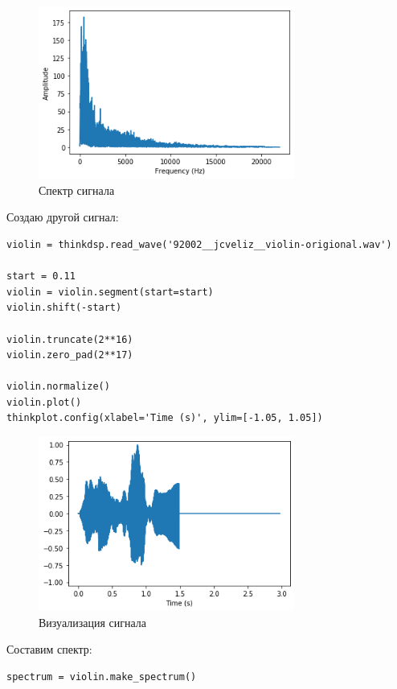 \documentclass[a4paper,12pt]{report}
\begin{document}
\begin{figure}[H]
        \centering
        \includegraphics[width=0.75\textwidth]{2.png}
        \caption{Спектр сигнала}
        \label{2}
\end{figure}

Создаю другой сигнал:

\begin{lstlisting}[caption=Усечение сигнала]
violin = thinkdsp.read_wave('92002__jcveliz__violin-origional.wav')

start = 0.11
violin = violin.segment(start=start)
violin.shift(-start)

violin.truncate(2**16)
violin.zero_pad(2**17)

violin.normalize()
violin.plot()
thinkplot.config(xlabel='Time (s)', ylim=[-1.05, 1.05])
\end{lstlisting}

\begin{figure}[H]
        \centering
        \includegraphics[width=0.75\textwidth]{3.png}
        \caption{Визуализация сигнала}
        \label{3}
\end{figure}

Составим спектр:

\begin{lstlisting}[caption=Спектр сигнала]
spectrum = violin.make_spectrum()
\end{lstlisting}
\end{document}
